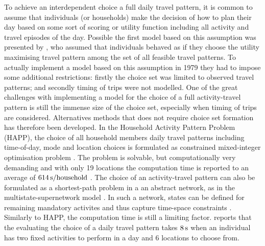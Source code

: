 To achieve an interdependent choice a full daily travel pattern, it is common to assume that individuals (or households) make the decision of how to plan their day based on some sort of scoring or utility function including all activity and travel episodes of the day. Possible the first model based on this assumption was presented by \citet{Adler79}, who assumed that individuals behaved as if they choose the utility maximising travel pattern among the set of all feasible travel patterns.
To actually implement a model based on this assumption in 1979 they had to impose some additional restrictions: firstly the choice set was limited to observed travel patterns; and secondly timing of trips were not modelled. One of the great challenges with implementing a model for the choice of a full activity-travel pattern is still the immense size of the choice set, especially when timing of trips are considered. Alternatives methods that does not require choice set formation has therefore been developed. In the Household Activity Pattern Problem (HAPP), the choice of all household members daily travel patterns including time-of-day, mode and location choices is formulated as constrained mixed-integer optimisation problem \citep{recker2001bridge,Recker08,Recker13,yuan2014HAPP}. The problem is solvable, but computationally very demanding and with only 19 locations the computation time is reported to an average of $614\, \mathrm{s/household}$ \citep{Recker13}. The choice of an activity-travel pattern can also be formulated as a shortest-path problem in a an abstract network, as in the multistate-supernetwork model \citep{arentze04Multistate}. In such a network, states can be defined for remaining mandatory activites and thus capture time-space constraints \citep{liao2013incorporating,liao2016modeling}. Similarly to HAPP, the computation time is still a limiting factor. \citet{liao2016modeling} reports that the evaluating the choice of a daily travel pattern takes $8\, \mathrm{s}$ when an individual has two fixed activities to perform in a day and 6 locations to choose from.

